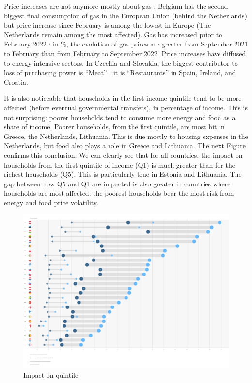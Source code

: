 \documentclass[
  9pt,
  a4paper,
  numbers=noendperiod,
  DIV=12]{scrartcl}
\begin{document}
Price increases are not anymore mostly about gas : Belgium has the
second biggest final consumption of gas in the European Union (behind
the Netherlands) but price increase since February is among the lowest
in Europe (The Netherlands remain among the most affected). Gas has
increased prior to February 2022 : in \%, the evolution of gas prices
are greater from September 2021 to February than from February to
September 2022. Price increases have diffused to energy-intensive
sectors. In Czechia and Slovakia, the biggest contributor to loss of
purchasing power is ``Meat'' ; it is ``Restaurants'' in Spain, Ireland,
and Croatia.

It is also noticeable that households in the first income quintile tend
to be more affected (before eventual governmental transfers), in
percentage of income. This is not surprising: poorer households tend to
consume more energy and food as a share of income. Poorer households,
from the first quintile, are most hit in Greece, the Netherlands,
Lithuania. This is due mostly to housing expenses in the Netherlands,
but food also plays a role in Greece and Lithuania. The next Figure
confirms this conclusion. We can clearly see that for all countries, the
impact on households from the first quintile of income (Q1) is much
greater than for the richest households (Q5). This is particularly true
in Estonia and Lithuania. The gap between how Q5 and Q1 are impacted is
also greater in countries where households are most affected: the
poorest households bear the most risk from energy and food price
volatility.

\begin{figure}

\caption{Impact on quintile}

{\centering \includegraphics{../svg/quantiles1et5.png}

}

\end{figure}
\end{document}
